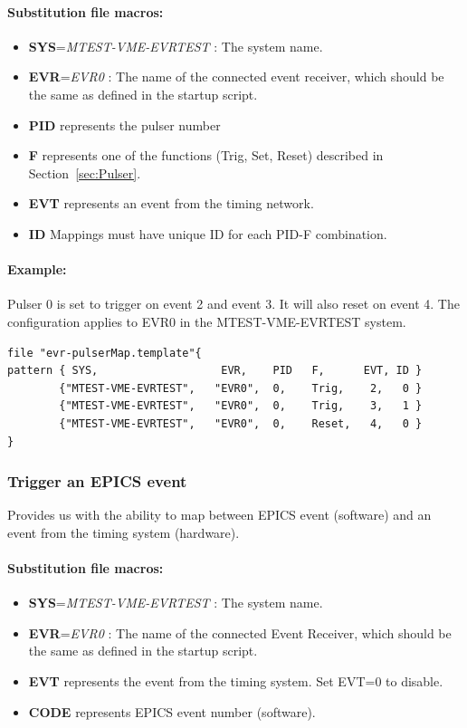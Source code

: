 \documentclass[12pt,a4paper]{article}
\begin{document}
\paragraph{Substitution file macros:}
\begin{itemize}
\item
	\textbf{SYS}=\emph{MTEST-VME-EVRTEST} : The system name. 
\item
	\textbf{EVR}=\emph{EVR0} : The name of the connected event receiver, which should be the same as defined in the startup script.
\item
  \textbf{PID} represents the pulser number
\item
  \textbf{F} represents one of the functions (Trig, Set, Reset) described in Section~\ref{sec:Pulser}.
\item
  \textbf{EVT} represents an event from the timing network.
\item
  \textbf{ID} Mappings must have unique ID for each PID-F combination.
\end{itemize}

\paragraph{Example:} Pulser 0 is set to trigger on event 2 and event 3. It will also
reset on event 4. The configuration applies to EVR0 in the MTEST-VME-EVRTEST system.

\begin{verbatim}
file "evr-pulserMap.template"{
pattern { SYS,                   EVR,    PID   F,      EVT, ID }
        {"MTEST-VME-EVRTEST",   "EVR0",  0,    Trig,    2,   0 }
        {"MTEST-VME-EVRTEST",   "EVR0",  0,    Trig,    3,   1 }
        {"MTEST-VME-EVRTEST",   "EVR0",  0,    Reset,   4,   0 }
}
\end{verbatim}


\subsubsection{Trigger an EPICS event}\label{evr-softevent.template}
Provides us with the ability to map between EPICS event (software) and an event from the timing system (hardware).

\paragraph{Substitution file macros:}
\begin{itemize}
	\item
		\textbf{SYS}=\emph{MTEST-VME-EVRTEST} : The system name.
	\item
		\textbf{EVR}=\emph{EVR0} : The name of the connected Event Receiver, which should be the same as defined in the startup script. 
	\item
	  \textbf{EVT} represents the event from the timing system. Set EVT=0 to disable.
	\item
	  \textbf{CODE} represents EPICS event number (software).
\end{itemize}
\end{document}
